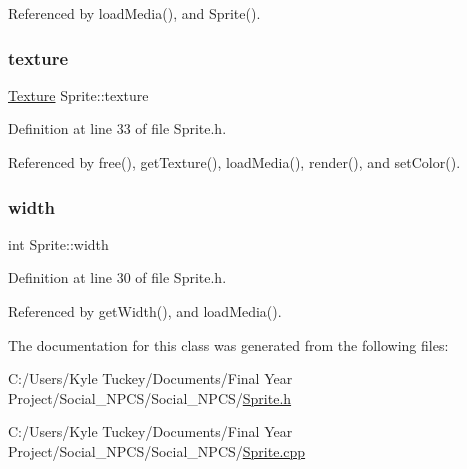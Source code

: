 Referenced by load\+Media(), and Sprite().

\mbox{\label{class_sprite_aa4978b284ebaae7225869d238dcb32cb}} 
\subsubsection{\texorpdfstring{texture}{texture}}
{\footnotesize\ttfamily \hyperlink{class_texture}{Texture} Sprite\+::texture\hspace{0.3cm}{\ttfamily [private]}}



Definition at line 33 of file Sprite.\+h.



Referenced by free(), get\+Texture(), load\+Media(), render(), and set\+Color().

\mbox{\label{class_sprite_a0a3364944c5e361fc9e7ae406224d682}} 
\subsubsection{\texorpdfstring{width}{width}}
{\footnotesize\ttfamily int Sprite\+::width\hspace{0.3cm}{\ttfamily [private]}}



Definition at line 30 of file Sprite.\+h.



Referenced by get\+Width(), and load\+Media().



The documentation for this class was generated from the following files\+:\begin{DoxyCompactItemize}
\item 
C\+:/\+Users/\+Kyle Tuckey/\+Documents/\+Final Year Project/\+Social\+\_\+\+N\+P\+C\+S/\+Social\+\_\+\+N\+P\+C\+S/\hyperlink{_sprite_8h}{Sprite.\+h}\item 
C\+:/\+Users/\+Kyle Tuckey/\+Documents/\+Final Year Project/\+Social\+\_\+\+N\+P\+C\+S/\+Social\+\_\+\+N\+P\+C\+S/\hyperlink{_sprite_8cpp}{Sprite.\+cpp}\end{DoxyCompactItemize}
